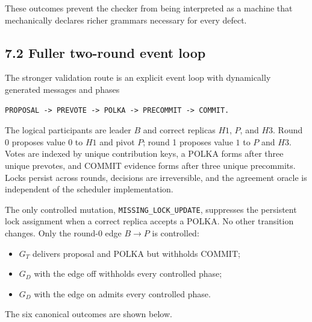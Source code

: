 \documentclass[10pt,a4paper]{article}
\newcommand{\tightlist}{\setlength{\itemsep}{0pt}\setlength{\parskip}{0pt}}
\begin{document}
These outcomes prevent the checker from being interpreted as a machine
that mechanically declares richer grammars necessary for every defect.

\subsection{7.2 Fuller two-round event
loop}\label{fuller-two-round-event-loop}

The stronger validation route is an explicit event loop with dynamically
generated messages and phases

\begin{verbatim}
PROPOSAL -> PREVOTE -> POLKA -> PRECOMMIT -> COMMIT.
\end{verbatim}

The logical participants are leader \(B\) and correct replicas \(H1\),
\(P\), and \(H3\). Round 0 proposes value \(0\) to \(H1\) and pivot
\(P\); round 1 proposes value \(1\) to \(P\) and \(H3\). Votes are
indexed by unique contribution keys, a POLKA forms after three unique
prevotes, and COMMIT evidence forms after three unique precommits. Locks
persist across rounds, decisions are irreversible, and the agreement
oracle is independent of the scheduler implementation.

The only controlled mutation, \texttt{MISSING\_LOCK\_UPDATE}, suppresses
the persistent lock assignment when a correct replica accepts a POLKA.
No other transition changes. Only the round-0 edge \(B\rightarrow P\) is
controlled:

\begin{itemize}
\tightlist
\item
  \(G_T\) delivers proposal and POLKA but withholds COMMIT;
\item
  \(G_D\) with the edge off withholds every controlled phase;
\item
  \(G_D\) with the edge on admits every controlled phase.
\end{itemize}

The six canonical outcomes are shown below.
\end{document}
